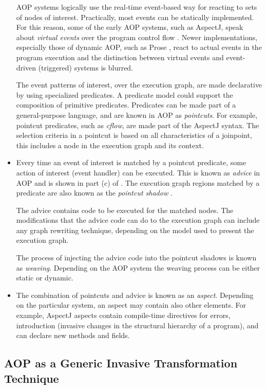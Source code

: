 \begin{itemize}
AOP systems logically use the real-time event-based way for reacting to sets of nodes of interest. Practically, most events can be statically implemented. For this reason, some of the early AOP systems, such as AspectJ, speak about \textit{virtual events} over the program control flow \cite{Laddad.aop}. Newer implementations, especially those of dynamic AOP, such as Prose \cite{prose}, react to actual events in the program execution and the distinction between virtual events and event-driven (triggered) systems is blurred. 

The event patterns of interest, over the execution graph, are made declarative by using specialized predicates. A predicate model could support the composition of primitive predicates. Predicates can be made part of a general-purpose language, and are known in AOP as \textit{pointcuts}. For example, pointcut predicates, such as \textit{cflow}, are made part of the AspectJ syntax. The selection criteria in a pointcut is based on all characteristics of a joinpoint, this includes a node in the execution graph and its context.

\item Every time an event of interest is matched by a pointcut predicate, some action of interest (event handler) can be executed. This is known as \textit{advice} in AOP and is shown in part (c) of . The execution graph regions matched by a predicate are also known as the \textit{pointcut shadow} \cite{aop.semantics.02}.

The advice contains code to be executed for the matched nodes. The modifications that the advice code can do to the execution graph can include any graph rewriting \cite{mens.99} technique, depending on the model used to present the execution graph.

The process of injecting the advice code into the pointcut shadows is known as \textit{weaving}. Depending on the AOP system the weaving process can be either static or dynamic.

\item The combination of pointcuts and advice is known as an \textit{aspect}. Depending on the particular system, an aspect may contain also other elements. For example, AspectJ aspects contain compile-time directives for errors, introduction (invasive changes in the structural hierarchy of a program), and can declare new methods and fields. 
\end{itemize}

\subsection{AOP as a Generic Invasive Transformation Technique}
\label{sec:aop-inv}

